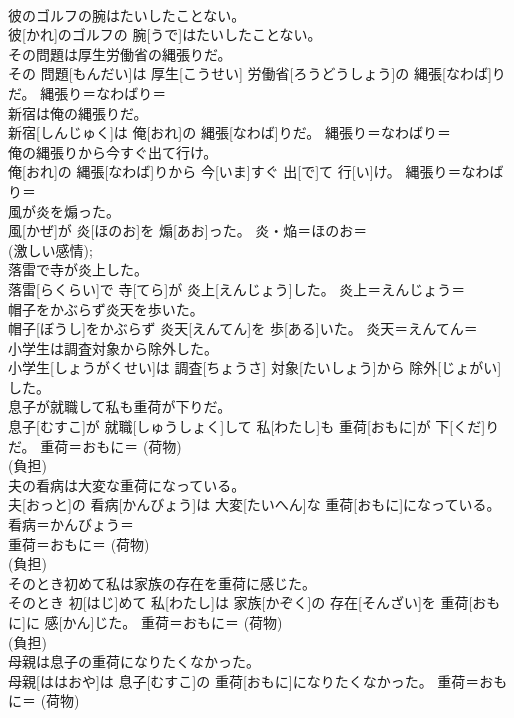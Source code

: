 \documentclass[8pt]{extreport}
\begin{document}
\begin{CJK}{UTF8}{min}
{\\	彼のゴルフの腕はたいしたことない。	
\\	彼[かれ]のゴルフの 腕[うで]はたいしたことない。	
\\	その問題は厚生労働省の縄張りだ。	
\\	その 問題[もんだい]は 厚生[こうせい] 労働省[ろうどうしょう]の 縄張[なわば]りだ。	縄張り＝なわばり＝ 
\\	新宿は俺の縄張りだ。	
\\	新宿[しんじゅく]は 俺[おれ]の 縄張[なわば]りだ。	縄張り＝なわばり＝ 
\\	俺の縄張りから今すぐ出て行け。	
\\	俺[おれ]の 縄張[なわば]りから 今[いま]すぐ 出[で]て 行[い]け。	縄張り＝なわばり＝ 
\\	風が炎を煽った。	
\\	風[かぜ]が 炎[ほのお]を 煽[あお]った。	炎・焔＝ほのお＝ 
\\	(激しい感情);
\\	落雷で寺が炎上した。	
\\	落雷[らくらい]で 寺[てら]が 炎上[えんじょう]した。	炎上＝えんじょう＝ 
\\	帽子をかぶらず炎天を歩いた。	
\\	帽子[ぼうし]をかぶらず 炎天[えんてん]を 歩[ある]いた。	炎天＝えんてん＝ 
\\	小学生は調査対象から除外した。	
\\	小学生[しょうがくせい]は 調査[ちょうさ] 対象[たいしょう]から 除外[じょがい]した。	
\\	息子が就職して私も重荷が下りだ。	
\\	息子[むすこ]が 就職[しゅうしょく]して 私[わたし]も 重荷[おもに]が 下[くだ]りだ。	重荷＝おもに＝ (荷物) 
\\	(負担) 
\\	夫の看病は大変な重荷になっている。	
\\	夫[おっと]の 看病[かんびょう]は 大変[たいへん]な 重荷[おもに]になっている。	看病＝かんびょう＝ 
\\	重荷＝おもに＝ (荷物) 
\\	(負担) 
\\	そのとき初めて私は家族の存在を重荷に感じた。	
\\	そのとき 初[はじ]めて 私[わたし]は 家族[かぞく]の 存在[そんざい]を 重荷[おもに]に 感[かん]じた。	重荷＝おもに＝ (荷物) 
\\	(負担) 
\\	母親は息子の重荷になりたくなかった。	
\\	母親[ははおや]は 息子[むすこ]の 重荷[おもに]になりたくなかった。	重荷＝おもに＝ (荷物) 
}
\end{CJK}
\end{document}
